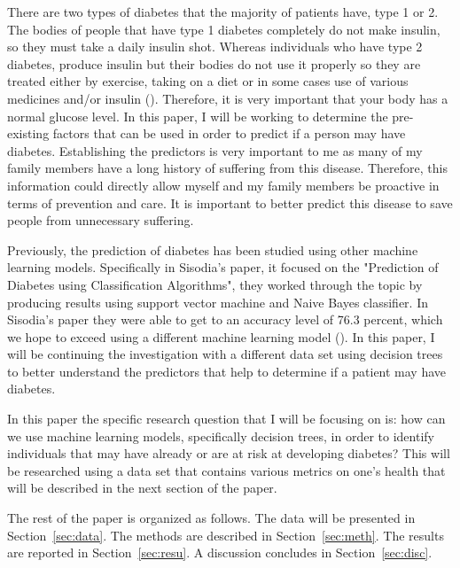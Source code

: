 \documentclass[12pt]{article}
\begin{document}
    There are two types of diabetes that the majority of patients have, type 1 or 2. The bodies of people that have type 1 diabetes
    completely do not make insulin, so they must take a daily insulin shot. Whereas individuals who have type 2 diabetes, produce insulin but 
    their bodies do not use it properly so they are treated either by exercise, taking on a diet or in some cases use of various medicines and/or insulin (\cite{JDC2023Difference}). 
    Therefore, it is very important that your body has a normal glucose level. In this paper, I will be working to determine the pre-existing
    factors that can be used in order to predict if a person may have diabetes. Establishing the predictors is very important to me as many of
    my family members have a long history of suffering from this disease. Therefore, this information could directly allow myself and my family members be
    proactive in terms of prevention and care. It is important to better predict this disease to save people from unnecessary suffering. 

    Previously, the prediction of diabetes has been studied using other machine learning models. Specifically in Sisodia's paper, it focused
    on the "Prediction of Diabetes using Classification Algorithms", they worked through the topic by producing results using support 
    vector machine and Naive Bayes classifier. In Sisodia's paper they were able to get to an accuracy level of 76.3 percent, which we hope to exceed using
    a different machine learning model (\cite{Sisodia2018Prediction}). In this paper, I will be 
    continuing the investigation with a different data set using decision trees to better understand the predictors that help to determine if a patient
    may have diabetes.

    In this paper the specific research question that I will be focusing on is: how can we use machine learning models, specifically decision trees, in order to identify 
    individuals that may have already or are at risk at developing diabetes? This will be researched using a data set that contains various 
    metrics on one's health that will be described in the next section of the paper.

    The rest of the paper is organized as follows.
    The data will be presented in Section~\ref{sec:data}.
    The methods are described in Section~\ref{sec:meth}.
    The results are reported in Section~\ref{sec:resu}.
    A discussion concludes in Section~\ref{sec:disc}.
\end{document}
